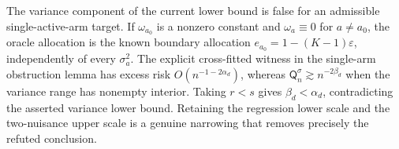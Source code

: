 The variance component of the current lower bound is false for an admissible single-active-arm target.  If \(\omega_{a_0}\) is a nonzero constant and \(\omega_a\equiv0\) for \(a\neq a_0\), the oracle allocation is the known boundary allocation \(e_{a_0}=1-(K-1)\varepsilon\), independently of every \(\sigma_a^2\).  The explicit cross-fitted witness in the single-arm obstruction lemma has excess risk \(O(n^{-1-2\alpha_d})\), whereas \(\mathsf Q_n^{\sigma}\gtrsim n^{-2\beta_d}\) when the variance range has nonempty interior.  Taking \(r<s\) gives \(\beta_d<\alpha_d\), contradicting the asserted variance lower bound.  Retaining the regression lower scale and the two-nuisance upper scale is a genuine narrowing that removes precisely the refuted conclusion.